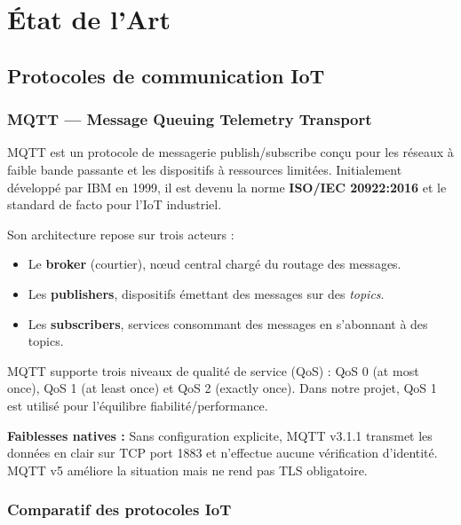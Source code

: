 \chapter{État de l'Art}

\section{Protocoles de communication IoT}

\subsection{MQTT — Message Queuing Telemetry Transport}

MQTT est un protocole de messagerie publish/subscribe conçu pour les réseaux à faible bande passante et les dispositifs à ressources limitées. Initialement développé par IBM en 1999, il est devenu la norme \textbf{ISO/IEC 20922:2016} et le standard de facto pour l'IoT industriel.

Son architecture repose sur trois acteurs :
\begin{itemize}
  \item Le \textbf{broker} (courtier), nœud central chargé du routage des messages.
  \item Les \textbf{publishers}, dispositifs émettant des messages sur des \textit{topics}.
  \item Les \textbf{subscribers}, services consommant des messages en s'abonnant à des topics.
\end{itemize}

MQTT supporte trois niveaux de qualité de service (\ac{QoS}) : QoS 0 (at most once), QoS 1 (at least once) et QoS 2 (exactly once). Dans notre projet, QoS 1 est utilisé pour l'équilibre fiabilité/performance.

\textbf{Faiblesses natives :} Sans configuration explicite, MQTT v3.1.1 transmet les données en clair sur TCP port 1883 et n'effectue aucune vérification d'identité. MQTT v5 améliore la situation mais ne rend pas TLS obligatoire.

\subsection{Comparatif des protocoles IoT}

